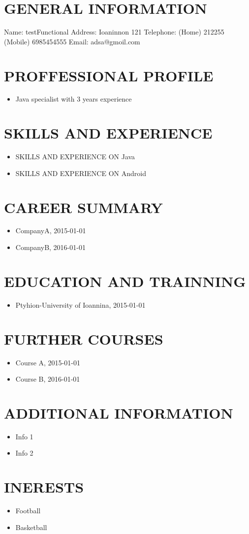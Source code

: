 \documentclass{article}
\begin{document}
 
\section{GENERAL INFORMATION}
Name: testFunctional
Address: Ioaninnon 121
Telephone: (Home) 212255 (Mobile) 6985454555
Email: adsa@gmoil.com
\section{PROFFESSIONAL PROFILE}
\begin{itemize}
\item Java specialist with 3 years experience
\end{itemize}
\section{SKILLS AND EXPERIENCE}
\begin{itemize}
\item SKILLS AND EXPERIENCE ON Java
\item SKILLS AND EXPERIENCE ON Android
\end{itemize}
\section{CAREER SUMMARY}
\begin{itemize}
\item CompanyA, 2015-01-01
\item CompanyB, 2016-01-01
\end{itemize}
\section{EDUCATION AND TRAINNING}
\begin{itemize}
\item Ptyhion-University of Ioannina, 2015-01-01
\end{itemize}
\section{FURTHER COURSES}
\begin{itemize}
\item Course A, 2015-01-01
\item Course B, 2016-01-01
\end{itemize}
\section{ADDITIONAL INFORMATION}
\begin{itemize}
\item Info 1
\item Info 2
\end{itemize}
\section{INERESTS}
\begin{itemize}
\item Football
\item Basketball
\end{itemize}
\end{document}
